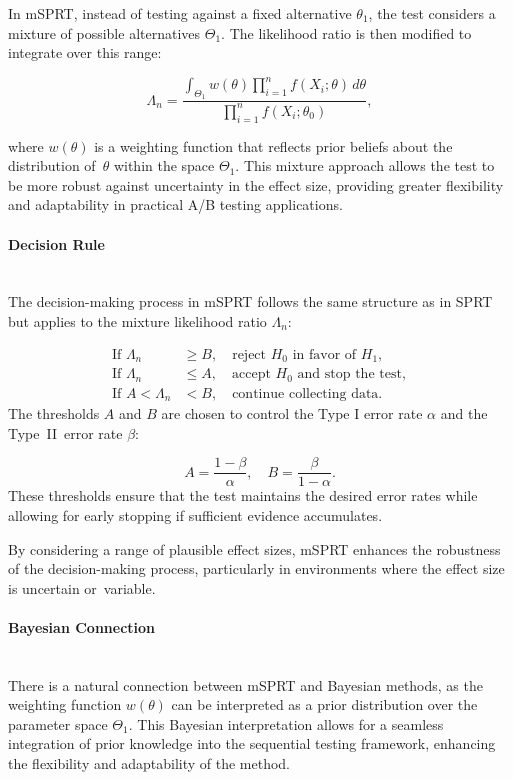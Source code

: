 \documentclass[magisterska, english]{pwr_wmat_praca_dyplomowa}
\theoremstyle{plain}
\numberwithin{theorem}{chapter}
\theoremstyle{definition}
\numberwithin{theorem}{chapter}
\newcommand{\myparagraph}[1]{\paragraph{#1}\mbox{}\\}
\begin{document}
In mSPRT, instead of testing against a fixed alternative \( \theta_1 \), the test considers a mixture of possible alternatives \( \Theta_1 \). The likelihood ratio is then modified to integrate over this range:

\[
\Lambda_n = \frac{\int_{\Theta_1} w(\theta) \prod_{i=1}^{n} f(X_i; \theta) \, d\theta}{\prod_{i=1}^{n} f(X_i; \theta_0)},
\]

where \( w(\theta) \) is a weighting function that reflects prior beliefs about the distribution of~\( \theta \) within the space \( \Theta_1 \). This mixture approach allows the test to be more robust against uncertainty in the effect size, providing greater flexibility and adaptability in practical A/B testing applications.

\myparagraph{Decision Rule}

The decision-making process in mSPRT follows the same structure as in SPRT but applies to the mixture likelihood ratio \( \Lambda_n \):

\begin{align*}
	\text{If } \Lambda_n &\geq B, \quad \text{reject } H_0 \text{ in favor of } H_1, \\
	\text{If } \Lambda_n &\leq A, \quad \text{accept } H_0 \text{ and stop the test}, \\
	\text{If } A < \Lambda_n &< B, \quad \text{continue collecting data}.
\end{align*}
The thresholds \( A \) and \( B \) are chosen to control the Type I error rate \( \alpha \) and the Type~II~error rate \( \beta \):

\[
A = \frac{1 - \beta}{\alpha}, \quad B = \frac{\beta}{1 - \alpha}.
\]
These thresholds ensure that the test maintains the desired error rates while allowing for early stopping if sufficient evidence accumulates.


By considering a range of plausible effect sizes, mSPRT enhances the robustness of the decision-making process, particularly in environments where the effect size is uncertain or~variable.

\myparagraph{Bayesian Connection}

There is a natural connection between mSPRT and Bayesian methods, as the weighting function \( w(\theta) \) can be interpreted as a prior distribution over the parameter space \( \Theta_1 \). This Bayesian interpretation allows for a seamless integration of prior knowledge into the sequential testing framework, enhancing the flexibility and adaptability of the method.
\end{document}

